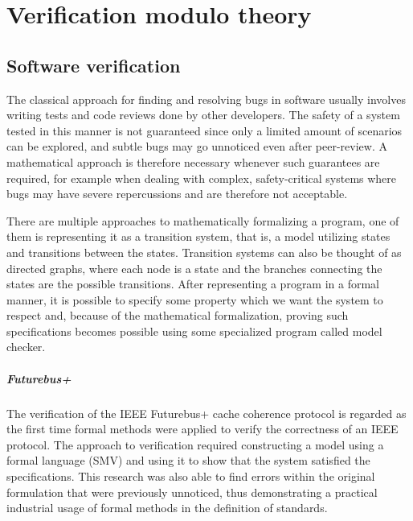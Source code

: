 \chapter{Verification modulo theory}

\section{Software verification}
The classical approach for finding and resolving bugs in software usually involves writing tests and code reviews done by other developers.
The safety of a system tested in this manner is not guaranteed since only a limited amount of scenarios can be explored, and subtle bugs may go unnoticed even after peer-review.
A mathematical approach is therefore necessary whenever such guarantees are required, for example when dealing with complex, safety-critical systems where bugs may have severe repercussions and are therefore not acceptable.

There are multiple approaches to mathematically formalizing a program, one of them is representing it as a transition system, that is, a model utilizing states and transitions between the states.
Transition systems can also be thought of as directed graphs, where each node is a state and the branches connecting the states are the possible transitions.
After representing a program in a formal manner, it is possible to specify some property which we want the system to respect and, because of the mathematical formalization, proving such specifications becomes possible using some specialized program called model checker.

\paragraph*{Futurebus+}
The verification of the IEEE Futurebus+ cache coherence protocol \cite{futurebus-plus} is regarded as the first time formal methods were applied to verify the correctness of an IEEE protocol.
The approach to verification required constructing a model using a formal language (SMV) and using it to show that the system satisfied the specifications.
This research was also able to find errors within the original formulation that were previously unnoticed, thus demonstrating a practical industrial usage of formal methods in the definition of standards.

